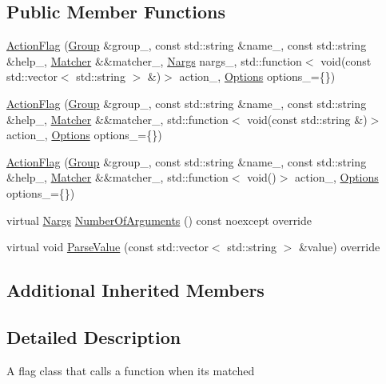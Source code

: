 \subsection*{Public Member Functions}
\begin{DoxyCompactItemize}
\item 
\hyperlink{classargs_1_1_action_flag_aa0f44a64b894b5cfe2410c9df7addd9d}{Action\+Flag} (\hyperlink{classargs_1_1_group}{Group} \&group\+\_\+, const std\+::string \&name\+\_\+, const std\+::string \&help\+\_\+, \hyperlink{classargs_1_1_matcher}{Matcher} \&\&matcher\+\_\+, \hyperlink{structargs_1_1_nargs}{Nargs} nargs\+\_\+, std\+::function$<$ void(const std\+::vector$<$ std\+::string $>$ \&)$>$ action\+\_\+, \hyperlink{namespaceargs_aa530c0f95194aa275f49a5f299ac9e77}{Options} options\+\_\+=\{\})
\item 
\hyperlink{classargs_1_1_action_flag_a0f5aa72ff82d751962e764e4b71bdff6}{Action\+Flag} (\hyperlink{classargs_1_1_group}{Group} \&group\+\_\+, const std\+::string \&name\+\_\+, const std\+::string \&help\+\_\+, \hyperlink{classargs_1_1_matcher}{Matcher} \&\&matcher\+\_\+, std\+::function$<$ void(const std\+::string \&)$>$ action\+\_\+, \hyperlink{namespaceargs_aa530c0f95194aa275f49a5f299ac9e77}{Options} options\+\_\+=\{\})
\item 
\hyperlink{classargs_1_1_action_flag_a811e7632dface8147a93ac5d19a1bd34}{Action\+Flag} (\hyperlink{classargs_1_1_group}{Group} \&group\+\_\+, const std\+::string \&name\+\_\+, const std\+::string \&help\+\_\+, \hyperlink{classargs_1_1_matcher}{Matcher} \&\&matcher\+\_\+, std\+::function$<$ void()$>$ action\+\_\+, \hyperlink{namespaceargs_aa530c0f95194aa275f49a5f299ac9e77}{Options} options\+\_\+=\{\})
\item 
virtual \hyperlink{structargs_1_1_nargs}{Nargs} \hyperlink{classargs_1_1_action_flag_aa341976acd895df15fb2bfe7182c48eb}{Number\+Of\+Arguments} () const noexcept override
\item 
virtual void \hyperlink{classargs_1_1_action_flag_abffb65449304c0799566c88c90adda0b}{Parse\+Value} (const std\+::vector$<$ std\+::string $>$ \&value) override
\end{DoxyCompactItemize}
\subsection*{Additional Inherited Members}


\subsection{Detailed Description}
A flag class that calls a function when it\textquotesingle{}s matched 

